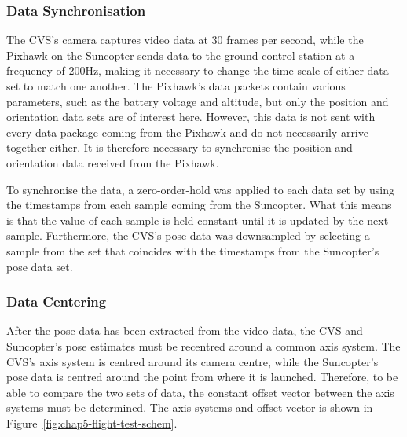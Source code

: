 \subsubsection{Data Synchronisation}

The CVS's camera captures video data at 30 frames per second, while the Pixhawk on the Suncopter sends data to the ground control station at a frequency of 200Hz, making it necessary to change the time scale of either data set to match one another. The Pixhawk's data packets contain various parameters, such as the battery voltage and altitude, but only the position and orientation data sets are of interest here. However, this data is not sent with every data package coming from the Pixhawk and do not necessarily arrive together either. It is therefore necessary to synchronise the position and orientation data received from the Pixhawk.

To synchronise the data, a zero-order-hold was applied to each data set by using the timestamps from each sample coming from the Suncopter. What this means is that the value of each sample is held constant until it is updated by the next sample. Furthermore, the CVS's pose data was downsampled by selecting a sample from the set that coincides with the timestamps from the Suncopter's pose data set. 

\subsubsection{Data Centering}
\label{sec:chap5-data-centring}

After the pose data has been extracted from the video data, the CVS and Suncopter's pose estimates must be recentred around a common axis system. The CVS's axis system is centred around its camera centre, while the Suncopter's pose data is centred around the point from where it is launched. Therefore, to be able to compare the two sets of data, the constant offset vector between the axis systems must be determined. The axis systems and offset vector is shown in Figure~\ref{fig:chap5-flight-test-schem}.

